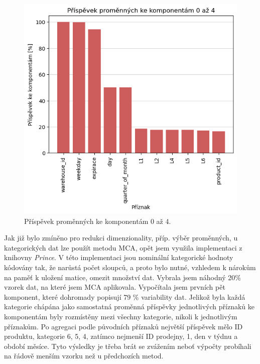 \begin{figure}[h!]
    \centering
    \includegraphics[width=.8\textwidth]{obrazky/zntb/pca-prispevky.png}
    \caption{Příspěvek proměnných ke komponentám 0 až 4.}
    \label{obr:nb:pca_prispevek}
\end{figure}
    
Jak již bylo zmíněno pro redukci dimenzionality, příp. výběr proměnných, u kategorických dat lze použít metodu MCA, opět jsem využila implementaci z knihovny \emph{Prince}. V této implementaci jsou nominální kategorické hodnoty kódovány tak, že narůstá počet sloupců, a proto bylo nutné, vzhledem k nárokům na paměť k uložení matice, omezit množství dat. Vybrala jsem náhodný 20\% vzorek dat, na které jsem MCA aplikovala. Vypočítala jsem prvních pět komponent, které dohromady popisují 79 \% variability dat. Jelikož byla každá kategorie chápána jako samostatná proměnná příspěvky jednotlivých příznaků ke komponentám byly rozmístěny mezi všechny kategorie, nikoli k jednotlivým příznakům. 
Po agregaci podle původních příznaků největší příspěvek mělo ID produktu, kategorie 6, 5, 4, zatímco nejmenší ID prodejny, 1, den v týdnu a období měsíce. Tyto výsledky je třeba brát se zvážením neboť výpočty probíhali na řádově menším vzorku než u předchozích metod.


